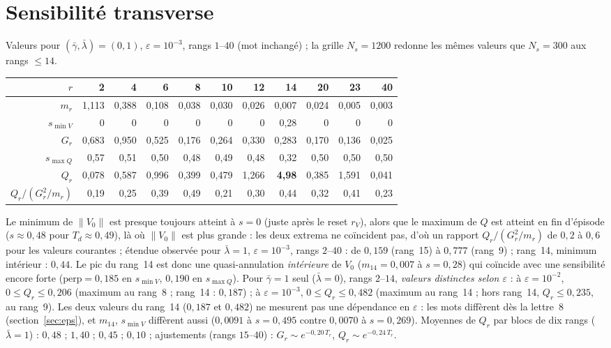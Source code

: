 \documentclass[11pt,a4paper]{article}
\theoremstyle{remark}
\newcommand{\norm}[1]{\lVert #1\rVert}
\begin{document}
\section{Sensibilit\'e transverse}\label{sec:Q}
Valeurs pour $(\bar\gamma,\bar\lambda)=(0,1)$, $\varepsilon=10^{-3}$, rangs $1$--$40$ (mot inchang\'e) ; la grille $N_s=1200$ redonne les m\^emes valeurs que $N_s=300$ aux rangs $\le14$.
\begin{center}\small
\begin{tabular}{r|rrrrrrrrrr}
\toprule
$r$ & 2 & 4 & 6 & 8 & 10 & 12 & 14 & 20 & 23 & 40\\
\midrule
$m_r$ & 1,113 & 0,388 & 0,108 & 0,038 & 0,030 & 0,026 & 0,007 & 0,024 & 0,005 & 0,003\\
$s_{\min V}$ & 0 & 0 & 0 & 0 & 0 & 0 & 0,28 & 0 & 0 & 0\\
$G_r$ & 0,683 & 0,950 & 0,525 & 0,176 & 0,264 & 0,330 & 0,283 & 0,170 & 0,136 & 0,025\\
$s_{\max Q}$ & 0,57 & 0,51 & 0,50 & 0,48 & 0,49 & 0,48 & 0,32 & 0,50 & 0,50 & 0,50\\
$Q_r$ & 0,078 & 0,587 & 0,996 & 0,399 & 0,479 & 1,266 & \textbf{4,98} & 0,385 & 1,591 & 0,041\\
$Q_r/(G_r^2/m_r)$ & 0,19 & 0,25 & 0,39 & 0,49 & 0,21 & 0,30 & 0,44 & 0,32 & 0,41 & 0,23\\
\bottomrule
\end{tabular}
\end{center}
Le minimum de $\norm{V_0}$ est presque toujours atteint \`a $s=0$ (juste apr\`es le reset $r_V$), alors que le maximum de $Q$ est atteint en fin d'\'episode ($s\approx0{,}48$ pour $T_d\approx0{,}49$), l\`a o\`u $\norm{V_0}$ est plus grande : les deux extrema ne coïncident pas, d'o\`u un rapport $Q_r/(G_r^2/m_r)$ de $0{,}2$ \`a $0{,}6$ pour les valeurs courantes ; \'etendue observ\'ee pour $\bar\lambda=1$, $\varepsilon=10^{-3}$, rangs $2$--$40$ : de $0{,}159$ (rang~15) \`a $0{,}777$ (rang~9) ; rang~14, minimum int\'erieur : $0{,}44$. Le pic du rang~14 est donc une quasi-annulation \emph{int\'erieure} de $V_0$ ($m_{14}=0{,}007$ \`a $s=0{,}28$) qui coïncide avec une sensibilit\'e encore forte ($\mathrm{perp}=0{,}185$ en $s_{\min V}$, $0{,}190$ en $s_{\max Q}$). Pour $\bar\gamma=1$ seul ($\bar\lambda=0$), rangs $2$--$14$, \emph{valeurs distinctes selon $\varepsilon$} : \`a $\varepsilon=10^{-2}$, $0\le Q_r\le0{,}206$ (maximum au rang~8 ; rang~14 : $0{,}187$) ; \`a $\varepsilon=10^{-3}$, $0\le Q_r\le0{,}482$ (maximum au rang~14 ; hors rang~14, $Q_r\le0{,}235$, au rang~9). Les deux valeurs du rang~14 ($0{,}187$ et $0{,}482$) ne mesurent pas une d\'ependance en $\varepsilon$ : les mots diff\`erent d\`es la lettre~8 (section~\ref{sec:eps}), et $m_{14}$, $s_{\min V}$ diff\`erent aussi ($0{,}0091$ \`a $s=0{,}495$ contre $0{,}0070$ \`a $s=0{,}269$). Moyennes de $Q_r$ par blocs de dix rangs ($\bar\lambda=1$) : $0{,}48$ ; $1{,}40$ ; $0{,}45$ ; $0{,}10$ ; ajustements (rangs $15$--$40$) : $G_r\sim e^{-0{,}20\,T_r}$, $Q_r\sim e^{-0{,}24\,T_r}$.
\end{document}
